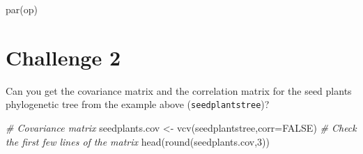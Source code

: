 \documentclass[
]{book}
\newenvironment{Shaded}{\begin{snugshade}}{\end{snugshade}}
\newcommand{\AttributeTok}[1]{\textcolor[rgb]{0.77,0.63,0.00}{#1}}
\newcommand{\CommentTok}[1]{\textcolor[rgb]{0.56,0.35,0.01}{\textit{#1}}}
\newcommand{\ConstantTok}[1]{\textcolor[rgb]{0.00,0.00,0.00}{#1}}
\newcommand{\DecValTok}[1]{\textcolor[rgb]{0.00,0.00,0.81}{#1}}
\newcommand{\FunctionTok}[1]{\textcolor[rgb]{0.00,0.00,0.00}{#1}}
\newcommand{\NormalTok}[1]{#1}
\newcommand{\OtherTok}[1]{\textcolor[rgb]{0.56,0.35,0.01}{#1}}
\begin{document}
\begin{Shaded}
\begin{Highlighting}[]
\FunctionTok{par}\NormalTok{(op)}
\end{Highlighting}
\end{Shaded}

\hypertarget{challenge-2-1}{%
\section{Challenge 2}\label{challenge-2-1}}

Can you get the covariance matrix and the correlation matrix for the seed plants phylogenetic tree from the example above (\texttt{seedplantstree})?

\begin{Shaded}
\begin{Highlighting}[]
\CommentTok{\# Covariance matrix}
\NormalTok{seedplants.cov }\OtherTok{\textless{}{-}} \FunctionTok{vcv}\NormalTok{(seedplantstree,}\AttributeTok{corr=}\ConstantTok{FALSE}\NormalTok{)}
\CommentTok{\# Check the first few lines of the matrix}
\FunctionTok{head}\NormalTok{(}\FunctionTok{round}\NormalTok{(seedplants.cov,}\DecValTok{3}\NormalTok{))}
\end{Highlighting}
\end{Shaded}
\end{document}
